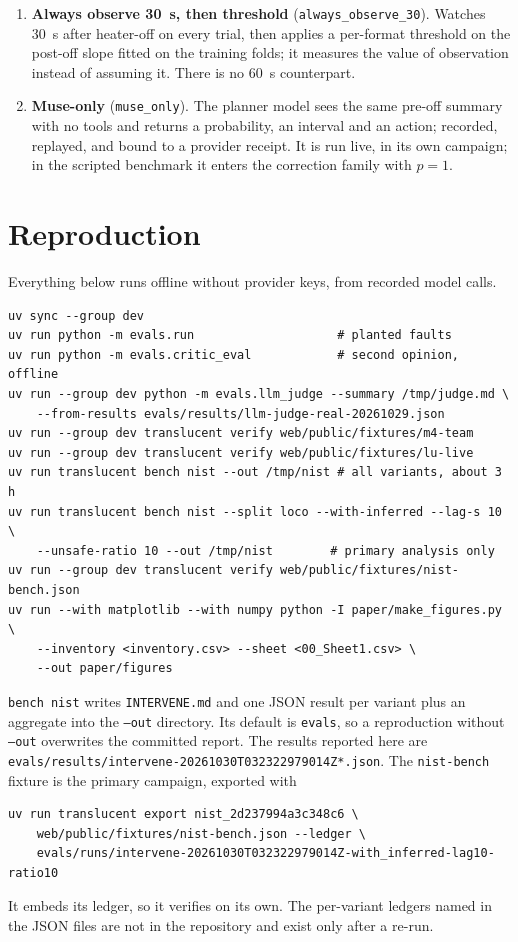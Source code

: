 \documentclass[11pt]{article}
\newcommand{\cmd}[1]{\texttt{#1}}
\begin{document}
\begin{enumerate}
  labelled simulated.
  \item \textbf{Always observe 30~s, then threshold} (\texttt{always\_observe\_30}). Watches 30~s after heater-off on
  every trial, then applies a per-format threshold on the post-off slope fitted on the training folds; it measures the
  value of observation instead of assuming it. There is no 60~s counterpart.
  \item \textbf{Muse-only} (\texttt{muse\_only}). The planner model sees the same pre-off summary with no tools and
  returns a probability, an interval and an action; recorded, replayed, and bound to a provider receipt. It is run
  live, in its own campaign; in the scripted benchmark it enters the correction family with $p=1$.
\end{enumerate}

\section{Reproduction}\label{app:repro}

Everything below runs offline without provider keys, from recorded model calls.
\begin{verbatim}
uv sync --group dev
uv run python -m evals.run                    # planted faults
uv run python -m evals.critic_eval            # second opinion, offline
uv run --group dev python -m evals.llm_judge --summary /tmp/judge.md \
    --from-results evals/results/llm-judge-real-20261029.json
uv run --group dev translucent verify web/public/fixtures/m4-team
uv run --group dev translucent verify web/public/fixtures/lu-live
uv run translucent bench nist --out /tmp/nist # all variants, about 3 h
uv run translucent bench nist --split loco --with-inferred --lag-s 10 \
    --unsafe-ratio 10 --out /tmp/nist        # primary analysis only
uv run --group dev translucent verify web/public/fixtures/nist-bench.json
uv run --with matplotlib --with numpy python -I paper/make_figures.py \
    --inventory <inventory.csv> --sheet <00_Sheet1.csv> \
    --out paper/figures
\end{verbatim}
\cmd{bench nist} writes \cmd{INTERVENE.md} and one JSON result per variant plus an aggregate into the \cmd{--out}
directory. Its default is \cmd{evals}, so a reproduction without \cmd{--out} overwrites the committed report. The
results reported here are \cmd{evals/results/intervene-20261030T032322979014Z*.json}. The \cmd{nist-bench} fixture is
the primary campaign, exported with
\begin{verbatim}
uv run translucent export nist_2d237994a3c348c6 \
    web/public/fixtures/nist-bench.json --ledger \
    evals/runs/intervene-20261030T032322979014Z-with_inferred-lag10-ratio10
\end{verbatim}
\noindent It embeds its ledger, so it verifies on its own. The per-variant ledgers named in the JSON files are not in the repository and exist only after a re-run.
\end{document}
